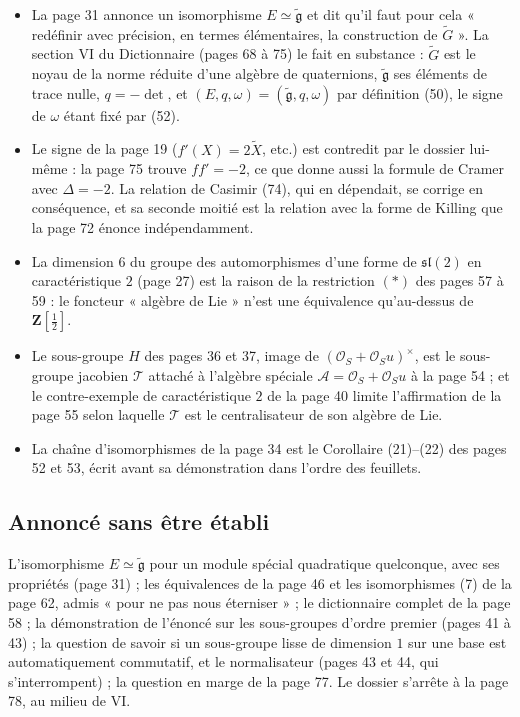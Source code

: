 \documentclass[11pt,a4paper]{article}
\begin{document}
\begin{itemize}
  \item La page 31 annonce un isomorphisme $E \simeq \widetilde{\mathfrak{g}}$ et dit
    qu'il faut pour cela « redéfinir avec précision, en termes élémentaires, la
    construction de $\widetilde{G}$ ». La section VI du Dictionnaire (pages 68 à
    75) le fait en substance : $\widetilde{G}$ est le noyau de la norme réduite d'une
    algèbre de quaternions, $\widetilde{\mathfrak{g}}$ ses éléments de trace nulle,
    $q = -\det$, et $(E, q, \omega) = (\widetilde{\mathfrak{g}}, q, \omega)$ par
    définition (50), le signe de $\omega$ étant fixé par (52).
  \item Le signe de la page 19 ($f'(X) = 2\widetilde{X}$, etc.) est contredit par le
    dossier lui-même : la page 75 trouve $ff' = -2$, ce que donne aussi la formule
    de Cramer avec $\Delta = -2$. La relation de Casimir (74), qui en dépendait, se
    corrige en conséquence, et sa seconde moitié est la relation avec la forme de
    Killing que la page 72 énonce indépendamment.
  \item La dimension $6$ du groupe des automorphismes d'une forme de
    $\mathfrak{sl}(2)$ en caractéristique $2$ (page 27) est la raison de la restriction
    $(*)$ des pages 57 à 59 : le foncteur « algèbre de Lie » n'est une équivalence
    qu'au-dessus de $\mathbf{Z}[\tfrac{1}{2}]$.
  \item Le sous-groupe $H$ des pages 36 et 37, image de
    $(\mathcal{O}_S + \mathcal{O}_S u)^{\times}$, est le sous-groupe jacobien $\mathcal{T}$
    attaché à l'algèbre spéciale $\mathcal{A} = \mathcal{O}_S + \mathcal{O}_S u$ à la page 54 ;
    et le contre-exemple de caractéristique $2$ de la page 40 limite
    l'affirmation de la page 55 selon laquelle $\mathcal{T}$ est le centralisateur de
    son algèbre de Lie.
  \item La chaîne d'isomorphismes de la page 34 est le Corollaire (21)--(22) des
    pages 52 et 53, écrit avant sa démonstration dans l'ordre des feuillets.
\end{itemize}

\subsection*{Annoncé sans être établi}

L'isomorphisme $E \simeq \widetilde{\mathfrak{g}}$ pour un module spécial quadratique
quelconque, avec ses propriétés (page 31) ; les équivalences de la page 46 et
les isomorphismes (7) de la page 62, admis « pour ne pas nous éterniser » ; le
dictionnaire complet de la page 58 ; la démonstration de l'énoncé sur les
sous-groupes d'ordre premier (pages 41 à 43) ; la question de savoir si un
sous-groupe lisse de dimension $1$ sur une base est automatiquement commutatif,
et le normalisateur (pages 43 et 44, qui s'interrompent) ; la question en marge
de la page 77. Le dossier s'arrête à la page 78, au milieu de VI.
\end{document}
